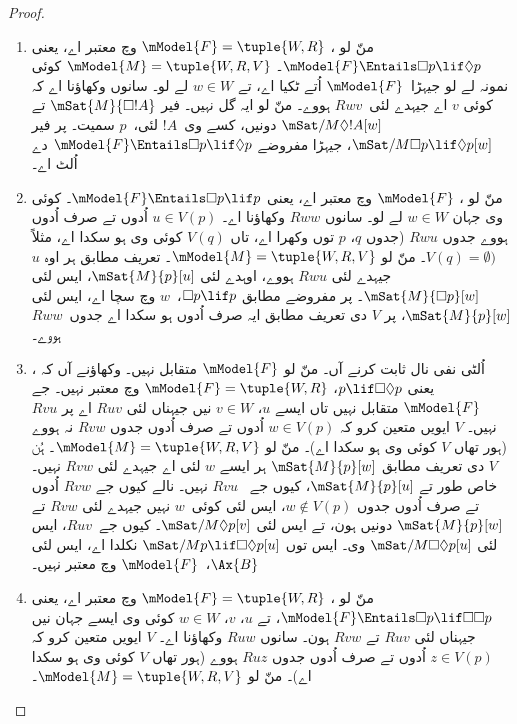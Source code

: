 \documentclass[../../../include/open-logic-section]{subfiles}
\begin{document}
\begin{proof}
  \begin{enumerate}
  \item منّ لو ، $\mModel{F} = \tuple{W, R}$ وچ معتبر اے، یعنی
    $\mModel{F} \Entails \Box p \lif \Diamond p$۔ $\mModel{M} =
    \tuple{W, R, V}$ کوئی نمونہ لے لو جیہڑا~$\mModel{F}$ اُتے ٹکیا اے، تے $w \in
    W$ لے لو۔ سانوں وکھاؤنا اے کہ کوئی $v$ اے جیہدے لئی~$Rwv$ ہووے۔ منّ لو ایہ گل نہیں۔ فیر $\mSat{M}{\Box !A}$ تے $\mSat/{M}{\Diamond !A}[w]$ دونیں، کسے وی~$!A$ لئی،~$p$ سمیت۔ پر فیر $\mSat/{M}{\Box p \lif
      \Diamond p}[w]$، جیہڑا مفروضے $\mModel{F}
    \Entails \Box p \lif \Diamond p$ دے اُلٹ اے۔
  \item منّ لو ، $\mModel{F}$ وچ معتبر اے، یعنی $\mModel{F} \Entails \Box
    p \lif p$۔ کوئی وی جہان $w \in W$ لے لو۔ سانوں $Rww$ وکھاؤنا اے۔ $u \in V(p)$ اُدوں تے صرف اُدوں ہووے جدوں $Rwu$ (جدوں $q$،
    $p$ توں وکھرا اے، تاں $V(q)$ کوئی وی ہو سکدا اے، مثلاً $V(q) = \emptyset)$۔ منّ لو
    $\mModel{M} = \tuple{W, R, V}$۔ تعریف مطابق ہر اوہ $u$ جیہدے لئی
    $Rwu$ ہووے، اوہدے لئی $\mSat{M}{p}[u]$، ایس لئی $\mSat{M}{\Box p}[w]$۔ پر مفروضے مطابق $\Box p \lif p$،~$w$ وچ سچا اے، ایس لئی
    $\mSat{M}{p}[w]$، پر $V$ دی تعریف مطابق ایہ صرف اُدوں ہو سکدا اے جدوں~$Rww$ ہووے۔
  \item اُلٹی نفی نال ثابت کرنے آں۔ منّ لو $\mModel{F}$ متقابل نہیں۔ وکھاؤنے آں کہ ، یعنی $p \lif \Box\Diamond p$،
    $\mModel{F}= \tuple{W, R}$ وچ معتبر نہیں۔ جے $\mModel{F}$ متقابل نہیں تاں ایسے $u$، $v \in W$ نیں جیہناں لئی $Ruv$ اے پر
    $Rvu$ نہیں۔ $V$ ایویں متعین کرو کہ $w \in V(p)$ اُدوں تے صرف اُدوں جدوں $Rvw$ نہ ہووے
    (ہور تھاں $V$ کوئی وی ہو سکدا اے)۔ منّ لو $\mModel{M} =\tuple{W, R,
      V}$۔ ہُن $V$ دی تعریف مطابق $\mSat{M}{p}[w]$ ہر ایسے $w$ لئی اے جیہدے لئی $Rvw$ نہیں۔ خاص طور تے $\mSat{M}{p}[u]$، کیوں جے
    ~$Rvu$ نہیں۔ نالے کیوں جے $Rvw$ اُدوں تے صرف اُدوں جدوں $w \notin V(p)$، ایس لئی کوئی~$w$ نہیں جیہدے لئی $Rvw$ تے $\mSat{M}{p}[w]$ دونیں ہون، تے ایس لئی
    $\mSat/{M}{\Diamond p}[v]$۔ کیوں جے~$Ruv$، ایس لئی
    $\mSat/{M}{\Box\Diamond p}[u]$ وی۔ ایس توں $\mSat/{M}{p \lif
      \Box\Diamond p}[u]$ نکلدا اے، ایس لئی $\Ax{B}$،~$\mModel{F}$ وچ معتبر نہیں۔
  \item منّ لو ، $\mModel{F} = \tuple{W,R}$ وچ معتبر اے، یعنی
    $\mModel{F} \Entails \Box p \lif \Box\Box p$، تے $u$، $v$، $w \in W$ کوئی وی ایسے جہان نیں جیہناں لئی $Ruv$ تے $Rvw$ ہون۔ سانوں
    $Ruw$ وکھاؤنا اے۔ $V$ ایویں متعین کرو کہ $z \in V(p)$ اُدوں تے صرف اُدوں جدوں $Ruz$ ہووے (ہور تھاں
    $V$ کوئی وی ہو سکدا اے)۔ منّ لو $\mModel{M} =\tuple{W, R, V}$۔

\end{enumerate}
\end{proof}
\end{document}
